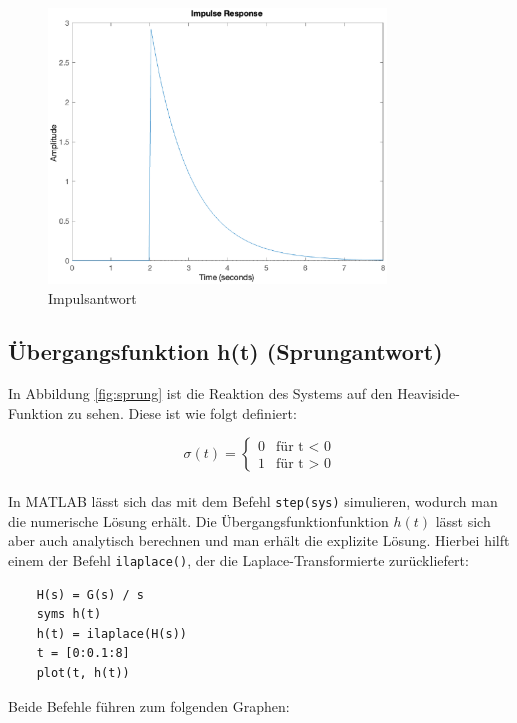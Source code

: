\begin{figure}[H]
    \label{fig:impuls}
    \centering
    \includegraphics[width=0.8\textwidth]{Bilder/ImpulsAntwortPT1Tt.eps}
    \caption{Impulsantwort}
 \end{figure}



\subsection{Übergangsfunktion h(t) (Sprungantwort)}

In Abbildung \ref{fig:sprung} ist die Reaktion des Systems auf den Heaviside-Funktion zu sehen. Diese ist wie folgt definiert:

\[
\sigma (t) = \begin{cases} 0 & \text{für t < 0} \\ 1 & \text{für t > 0} \end{cases}  
\]
\\
In MATLAB lässt sich das mit dem Befehl \texttt{step(sys)} simulieren, wodurch man die numerische Lösung erhält. Die Übergangsfunktionfunktion $h(t)$ lässt sich aber auch analytisch berechnen und man erhält die explizite Lösung. Hierbei hilft einem der Befehl \texttt{ilaplace()}, der die Laplace-Transformierte zurückliefert:

\begin{lstlisting}
    H(s) = G(s) / s
    syms h(t)
    h(t) = ilaplace(H(s))
    t = [0:0.1:8]
    plot(t, h(t))
\end{lstlisting} 

Beide Befehle führen zum folgenden Graphen:

